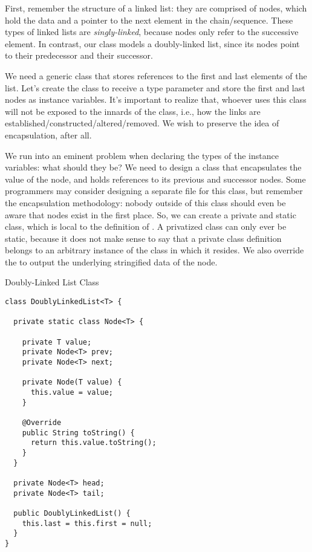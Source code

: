 
First, remember the structure of a linked list: they are comprised of nodes, which hold the data and a pointer to the next element in the chain/sequence. These types of linked lists are \textit{singly-linked}, because nodes only refer to the successive element. In contrast, our class models a doubly-linked list, since its nodes point to their predecessor and their successor. 

We need a generic class that stores references to the first and last elements of the list. Let's create the  class to receive a type parameter  and store the first and last nodes as instance variables. It's important to realize that, whoever uses this class will not be exposed to the innards of the class, i.e., how the links are established/constructed/altered/removed. We wish to preserve the idea of encapsulation, after all.

We run into an eminent problem when declaring the types of the instance variables: what should they be? We need to design a class that encapsulates the value of the node, and holds references to its previous and successor nodes. Some programmers may consider designing a separate  file for this class, but remember the encapsulation methodology: nobody outside of this class should even be aware that nodes exist in the first place. So, we can create a private and static  class, which is local to the definition of . A privatized class can only ever be static, because it does not make sense to say that a private class definition belongs to an arbitrary instance of the class in which it resides. We also override the  to output the underlying stringified data of the node.

\begin{cl}[]{Doubly-Linked List Class}
\begin{lstlisting}[language=MyJava]
class DoublyLinkedList<T> {

  private static class Node<T> {

    private T value;
    private Node<T> prev;
    private Node<T> next;

    private Node(T value) { 
      this.value = value; 
    }

    @Override
    public String toString() {
      return this.value.toString();
    }
  }

  private Node<T> head;
  private Node<T> tail;

  public DoublyLinkedList() {
    this.last = this.first = null;
  }
}
\end{lstlisting}
\end{cl}

